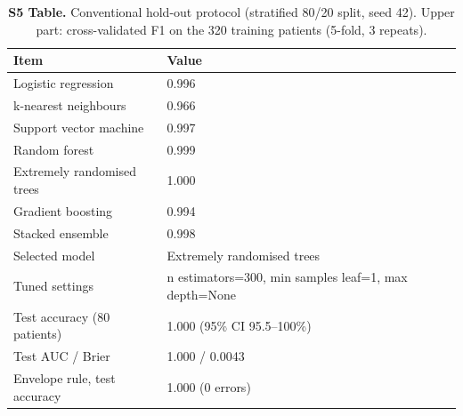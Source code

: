 \begin{table}[!ht]\centering\small
\caption{{\bf S5 Table.} Conventional hold-out protocol (stratified 80/20 split, seed 42). Upper part: cross-validated F1 on the 320 training patients (5-fold, 3 repeats).}
\begin{tabular}{ll}\toprule
Item & Value\\\midrule
Logistic regression & 0.996\\
k-nearest neighbours & 0.966\\
Support vector machine & 0.997\\
Random forest & 0.999\\
Extremely randomised trees & 1.000\\
Gradient boosting & 0.994\\
Stacked ensemble & 0.998\\
\midrule Selected model & Extremely randomised trees\\
Tuned settings & n estimators=300, min samples leaf=1, max depth=None\\
Test accuracy (80 patients) & 1.000 (95\% CI 95.5--100\%)\\
Test AUC / Brier & 1.000 / 0.0043\\
Envelope rule, test accuracy & 1.000 (0 errors)\\
\bottomrule\end{tabular}\end{table}

